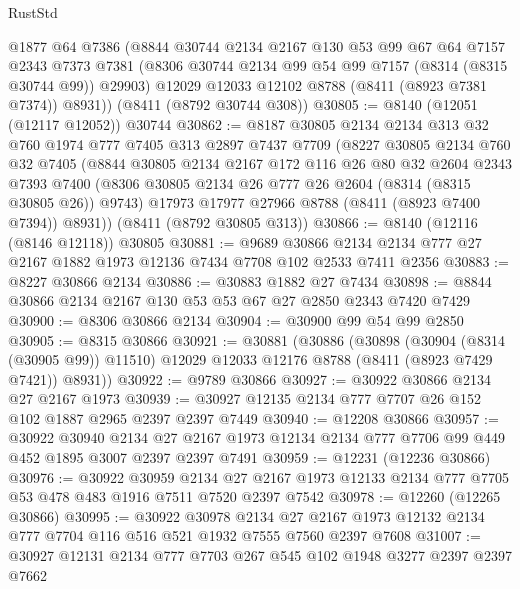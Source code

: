 \begin{lexlean}{RustStd}
\begin{coremodule}
      @1877
      @64
      @7386
      (@8844
        @30744
        @2134
        @2167
        @130
        @53
        @99
        @67
        @64
        @7157
        @2343
        @7373
        @7381
        (@8306 @30744 @2134 @99 @54 @99 @7157 (@8314 (@8315 @30744 @99)) @29903)
        @12029
        @12033
        @12102
        @8788
        (@8411 (@8923 @7381 @7374))
        @8931))
    (@8411 (@8792 @30744 @308))
@30805 := @8140 (@12051 (@12117 @12052)) @30744
@30862 := @8187
    @30805
    @2134
    @2134
    @313
    @32
    @760
    @1974
    @777
    @7405
    @313
    @2897
    @7437
    @7709
    (@8227
      @30805
      @2134
      @760
      @32
      @7405
      (@8844
        @30805
        @2134
        @2167
        @172
        @116
        @26
        @80
        @32
        @2604
        @2343
        @7393
        @7400
        (@8306 @30805 @2134 @26 @777 @26 @2604 (@8314 (@8315 @30805 @26)) @9743)
        @17973
        @17977
        @27966
        @8788
        (@8411 (@8923 @7400 @7394))
        @8931))
    (@8411 (@8792 @30805 @313))
@30866 := @8140 (@12116 (@8146 @12118)) @30805
@30881 := @9689
    @30866
    @2134
    @2134
    @777
    @27
    @2167
    @1882
    @1973
    @12136
    @7434
    @7708
    @102
    @2533
    @7411
    @2356
@30883 := @8227 @30866 @2134
@30886 := @30883 @1882 @27 @7434
@30898 := @8844 @30866 @2134 @2167 @130 @53 @53 @67 @27 @2850 @2343 @7420 @7429
@30900 := @8306 @30866 @2134
@30904 := @30900 @99 @54 @99 @2850
@30905 := @8315 @30866
@30921 := @30881
    (@30886
      (@30898
        (@30904 (@8314 (@30905 @99)) @11510)
        @12029
        @12033
        @12176
        @8788
        (@8411 (@8923 @7429 @7421))
        @8931))
@30922 := @9789 @30866
@30927 := @30922 @30866 @2134 @27 @2167 @1973
@30939 := @30927 @12135 @2134 @777 @7707 @26 @152 @102 @1887 @2965 @2397 @2397 @7449
@30940 := @12208 @30866
@30957 := @30922
    @30940
    @2134
    @27
    @2167
    @1973
    @12134
    @2134
    @777
    @7706
    @99
    @449
    @452
    @1895
    @3007
    @2397
    @2397
    @7491
@30959 := @12231 (@12236 @30866)
@30976 := @30922
    @30959
    @2134
    @27
    @2167
    @1973
    @12133
    @2134
    @777
    @7705
    @53
    @478
    @483
    @1916
    @7511
    @7520
    @2397
    @7542
@30978 := @12260 (@12265 @30866)
@30995 := @30922
    @30978
    @2134
    @27
    @2167
    @1973
    @12132
    @2134
    @777
    @7704
    @116
    @516
    @521
    @1932
    @7555
    @7560
    @2397
    @7608
@31007 := @30927 @12131 @2134 @777 @7703 @267 @545 @102 @1948 @3277 @2397 @2397 @7662

\end{coremodule}
\end{lexlean}

